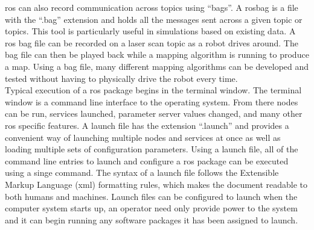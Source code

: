 \acrshort{ros} can also record communication across topics using ``bags''. A rosbag is a file with the ``.bag'' extension and holds all the messages sent across a given topic or topics. This tool is particularly useful in simulations based on existing data. A \acrshort{ros} bag file can be recorded on a laser scan topic as a robot drives around. The bag file can then be played back while a mapping algorithm is running to produce a map. Using a bag file, many different mapping algorithms can be developed and tested without having to physically drive the robot every time.\\

Typical execution of a \acrshort{ros} package begins in the terminal window. The terminal window is a command line interface to the operating system. From there nodes can be run, services launched, parameter server values changed, and many other \acrshort{ros} specific features. A launch file has the extension ``.launch'' and provides a convenient way of launching multiple nodes and services at once as well as loading multiple sets of configuration parameters. Using a launch file, all of the command line entries to launch and configure a \acrshort{ros} package can be executed using a singe command. The syntax of a launch file follows the Extensible Markup Language (\acrshort{xml}) formatting rules, which makes the document readable to both humans and machines. Launch files can be configured to launch when the computer system starts up, an operator need only provide power to the system and it can begin running any software packages it has been assigned to launch.\\